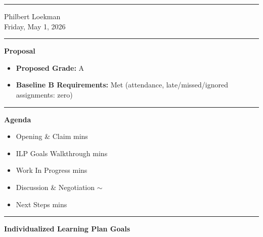 \documentclass[10pt]{article}
\begin{document}
\thispagestyle{fancy}
\vspace{-12pt}

\vspace{5pt}\hrule\vspace{3pt}
Philbert Loekman\\
Friday, May 1, 2026

\vspace{4pt}\hrule\vspace{5pt}

\textbf{Proposal}

\begin{small}
\begin{itemize}
  \item \textbf{Proposed Grade:} A
  \item \textbf{Baseline B Requirements:} Met (attendance, late/missed/ignored assignments: zero)
\end{itemize}
\end{small}

\vspace{3pt}\hrule\vspace{5pt}

\textbf{Agenda}

\begin{small}
\begin{itemize}
  \item Opening \& Claim  mins
  \item ILP Goals Walkthrough  mins
  \item Work In Progress  mins
  \item Discussion \& Negotiation \dotfill $\sim$
  \item Next Steps  mins
\end{itemize}
\end{small}

\vspace{3pt}\hrule\vspace{5pt}

\textbf{Individualized Learning Plan Goals}
\end{document}
